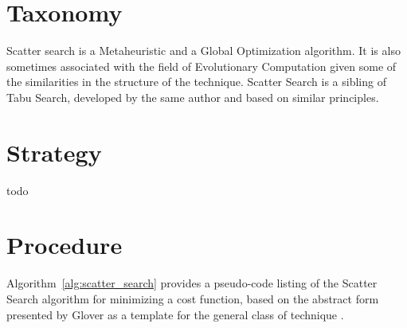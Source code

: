 \documentclass[a4paper, 11pt]{article}
\begin{document}
\section{Taxonomy}
\label{sec:taxonomy}
Scatter search is a Metaheuristic and a Global Optimization algorithm. It is also sometimes associated with the field of Evolutionary Computation given some of the similarities in the structure of the technique.
Scatter Search is a sibling of Tabu Search, developed by the same author and based on similar principles.

\section{Strategy}
\label{sec:strategy}
todo

\section{Procedure}
\label{sec:procedure}
Algorithm~\ref{alg:scatter_search} provides a pseudo-code listing of the Scatter Search algorithm for minimizing a cost function, based on the abstract form presented by Glover as a template for the general class of technique \cite{Glover1998a}.
\end{document}
